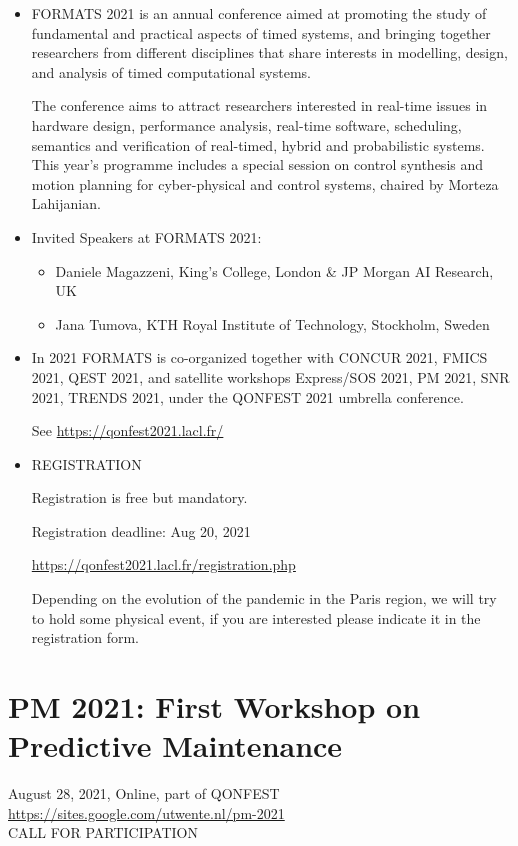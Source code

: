 \documentclass[prodmode,acmtecs]{acmsmall} %
\begin{document}
\begin{itemize}\item  FORMATS 2021 is an annual conference aimed at promoting the study of fundamental and practical aspects of timed systems,  and bringing together researchers from different disciplines that share interests in modelling, design, and analysis of timed computational systems.  
 
  The conference aims to attract researchers interested in real-time issues in hardware design, performance analysis, real-time software,  scheduling, semantics and verification of real-timed, hybrid and probabilistic systems.   This year's programme includes a special session on control synthesis and motion planning for cyber-physical and control systems, chaired by Morteza Lahijanian. 
 
\item  Invited Speakers at FORMATS 2021:   
 
\begin{itemize}\item  Daniele Magazzeni, King's College, London \& JP Morgan AI Research, UK  
\item  Jana Tumova, KTH Royal Institute of Technology, Stockholm, Sweden  
\end{itemize} 
\item  In 2021 FORMATS is co-organized together with CONCUR 2021, FMICS 2021, QEST 2021, and satellite workshops  Express/SOS 2021, PM 2021, SNR 2021, TRENDS 2021, under the QONFEST 2021 umbrella conference.  
 
  See \href{https://qonfest2021.lacl.fr/}{https://qonfest2021.lacl.fr/} 
 
\item  REGISTRATION 
 
  Registration is free but mandatory.   
 
Registration deadline: Aug 20, 2021 
 
  \href{https://qonfest2021.lacl.fr/registration.php}{https://qonfest2021.lacl.fr/registration.php} 
 
  Depending on the evolution of the pandemic in the Paris region, we will try to hold some physical event, if you are interested please indicate it in the registration form. 
 
\end{itemize}\section{PM 2021: First Workshop on Predictive Maintenance}\label{PM2021}  August 28, 2021, Online, part of QONFEST\\ 
  \href{https://sites.google.com/utwente.nl/pm-2021}{https://sites.google.com/utwente.nl/pm-2021}\\ 
CALL FOR PARTICIPATION 
\end{document}
